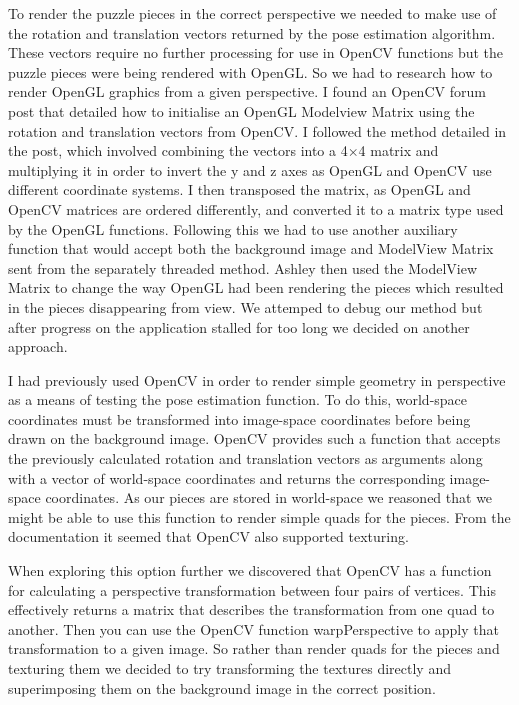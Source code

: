 \documentclass{article}
\begin{document}
To render the puzzle pieces in the correct perspective we needed to make use of the rotation and translation vectors returned by the pose estimation algorithm. These vectors require no further processing for use in OpenCV functions but the puzzle pieces were being rendered with OpenGL. So we had to research how to render OpenGL graphics from a given perspective. %
I found an OpenCV forum post that detailed how to initialise an OpenGL Modelview Matrix using the rotation and translation vectors from OpenCV. I followed the method detailed in the post, which involved combining the vectors into a 4$\times$4 matrix and multiplying it in order to invert the y and z axes as OpenGL and OpenCV use different coordinate systems. I then transposed the matrix, as OpenGL and OpenCV matrices are ordered differently, and converted it to a matrix type used by the OpenGL functions. Following this we had to use another auxiliary function that would accept both the background image and ModelView Matrix sent from the separately threaded method. Ashley then used the ModelView Matrix to change the way OpenGL had been rendering the pieces which resulted in the pieces disappearing from view. We attemped to debug our method but after progress on the application stalled for too long we decided on another approach. 


I had previously used OpenCV in order to render simple geometry in perspective as a means of testing the pose estimation function. To do this, world-space coordinates must be transformed into image-space coordinates before being drawn on the background image. OpenCV provides such a function that accepts the previously calculated rotation and translation vectors as arguments along with a vector of world-space coordinates and returns the corresponding image-space coordinates. As our pieces are stored in world-space we reasoned that we might be able to use this function to render simple quads for the pieces. From the documentation it seemed that OpenCV also supported texturing. 

When exploring this option further we discovered that OpenCV has a function for calculating a perspective transformation between four pairs of vertices. This effectively returns a matrix that describes the transformation from one quad to another. Then you can use the OpenCV function warpPerspective to apply that transformation to a given image. So rather than render quads for the pieces and texturing them we decided to try transforming the textures directly and superimposing them on the background image in the correct position. 
\end{document}
